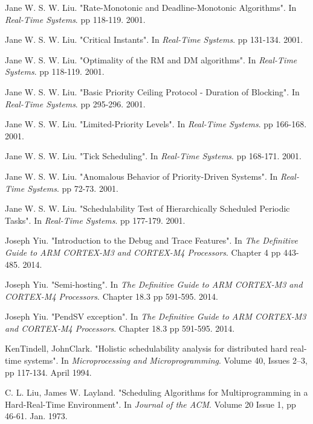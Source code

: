 \documentclass{article}
\begin{document}
\begin{thebibliography}{1}
Jane W. S. W. Liu.
\newblock "Rate-Monotonic and Deadline-Monotonic Algorithms".
\newblock In {\em Real-Time Systems}. pp 118-119. 2001.

Jane W. S. W. Liu.
\newblock "Critical Instants".
\newblock In {\em Real-Time Systems}. pp 131-134. 2001.

Jane W. S. W. Liu.
\newblock "Optimality of the RM and DM algorithms".
\newblock In {\em Real-Time Systems}. pp 118-119. 2001.

Jane W. S. W. Liu.
\newblock "Basic Priority Ceiling Protocol - Duration of Blocking".
\newblock In {\em Real-Time Systems}. pp 295-296. 2001.

Jane W. S. W. Liu.
\newblock "Limited-Priority Levels".
\newblock In {\em Real-Time Systems}. pp 166-168. 2001.

Jane W. S. W. Liu.
\newblock "Tick Scheduling".
\newblock In {\em Real-Time Systems}. pp 168-171. 2001.

Jane W. S. W. Liu.
\newblock "Anomalous Behavior of Priority-Driven Systems".
\newblock In {\em Real-Time Systems}. pp 72-73. 2001.

Jane W. S. W. Liu.
\newblock "Schedulability Test of Hierarchically Scheduled Periodic Tasks".
\newblock In {\em Real-Time Systems}. pp 177-179. 2001.

Joseph Yiu.
\newblock "Introduction to the Debug and Trace Features".
\newblock In {\em The Definitive Guide to ARM CORTEX-M3 and CORTEX-M4 Processors}. Chapter 4 pp 443-485. 2014.

Joseph Yiu.
\newblock "Semi-hosting".
\newblock In {\em The Definitive Guide to ARM CORTEX-M3 and CORTEX-M4 Processors}. Chapter 18.3 pp 591-595. 2014.

Joseph Yiu.
\newblock "PendSV exception".
\newblock In {\em The Definitive Guide to ARM CORTEX-M3 and CORTEX-M4 Processors}. Chapter 18.3 pp 591-595. 2014.

KenTindell, JohnClark.
\newblock "Holistic schedulability analysis for distributed hard real-time systems".
\newblock In {\em Microprocessing and Microprogramming}. Volume 40, Issues 2–3, pp 117-134. April 1994.

C. L. Liu, James W. Layland.
\newblock "Scheduling Algorithms for Multiprogramming in a Hard-Real-Time Environment".
\newblock In {\em Journal of the ACM}. Volume 20 Issue 1, pp 46-61. Jan. 1973.


\end{thebibliography}
\end{document}

